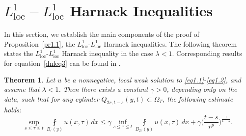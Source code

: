\documentclass[a4paper,11pt,fullpage]{article}
\numberwithin{equation}{section}
\newtheorem{theorem}{Theorem}[section]
\begin{document}
\section{$L^{1}_{\mathrm{loc}}-L^{1}_{\mathrm{loc}}$ Harnack Inequalities}\label{Main components}

In this section, we establish the main components of the proof of Proposition~\ref{pr1.1}, the $L^{1}_{\mathrm{loc}}$-$L^{1}_{\mathrm{loc}}$ Harnack inequalities. The following theorem states the $L^{1}_{\mathrm{loc}}$-$L^{1}_{\mathrm{loc}}$ Harnack inequality in the case $\lambda<1$. Corresponding results for equation~\eqref{dnleq3} can be found in \cite[Proposition~7.1]{BogDuzGiaLiaSch}.

\begin{theorem}\label{lem3.1}
Let $u$ be a nonnegative, local weak solution to \eqref{eq1.1}-\eqref{eq1.2}, and assume that $\lambda<1$. Then there exists a constant $\gamma>0$, depending only on the data, such that for any cylinder $Q_{2r,t-s}(y,t)\subset\Omega_T$, the following estimate holds:
\begin{equation}\label{eq3.1}
\sup\limits_{s\leqslant \tau\leqslant t}\fint\limits_{B_{r}(y)}u(x, \tau)\, dx \leqslant \gamma
\inf\limits_{s\leqslant \tau \leqslant t}\fint\limits_{B_{2 r}(y)} u(x, \tau)\,dx +\gamma
\Big(\frac{t-s}{r^{p}}\Big)^{\frac{1}{1-\lambda}}.
\end{equation}
\end{theorem}
\end{document}
